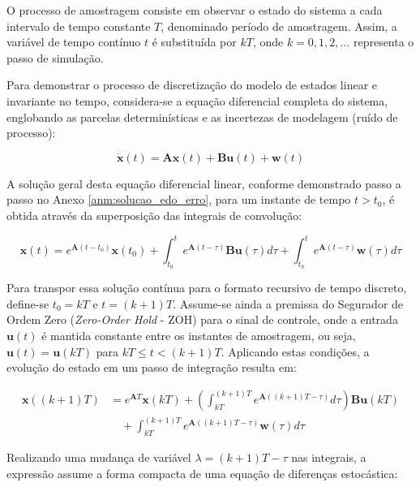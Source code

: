 \documentclass[a4paper,12pt]{article}
\begin{document}
O processo de amostragem consiste em observar o estado do sistema a cada intervalo de tempo constante $T$, denominado período de amostragem. Assim, a variável de tempo contínuo $t$ é substituída por $kT$, onde $k = 0, 1, 2, \dots$ representa o passo de simulação. 

Para demonstrar o processo de discretização do modelo de estados linear e invariante no tempo, considera-se a equação diferencial completa do sistema, englobando as parcelas determinísticas e as incertezas de modelagem (ruído de processo):

\begin{equation}
    \dot{\mathbf{x}}(t) = \mathbf{A}\mathbf{x}(t) + \mathbf{B}\mathbf{u}(t) + \mathbf{w}(t)
    \label{eq:dx_dt_completa}
\end{equation}

A solução geral desta equação diferencial linear, conforme demonstrado passo a passo no Anexo \ref{anm:solucao_edo_erro}, para um instante de tempo $t > t_0$, é obtida através da superposição das integrais de convolução:

\begin{equation}
    \mathbf{x}(t) = e^{\mathbf{A}(t-t_0)}\mathbf{x}(t_0) + \int_{t_0}^{t} e^{\mathbf{A}(t-\tau)} \mathbf{B}\mathbf{u}(\tau) d\tau + \int_{t_0}^{t} e^{\mathbf{A}(t-\tau)} \mathbf{w}(\tau) d\tau
\end{equation}

Para transpor essa solução contínua para o formato recursivo de tempo discreto, define-se $t_0 = kT$ e $t = (k+1)T$. Assume-se ainda a premissa do Segurador de Ordem Zero (\textit{Zero-Order Hold} - ZOH) para o sinal de controle, onde a entrada $\mathbf{u}(t)$ é mantida constante entre os instantes de amostragem, ou seja, $\mathbf{u}(t) = \mathbf{u}(kT)$ para $kT \le t < (k+1)T$. Aplicando estas condições, a evolução do estado em um passo de integração resulta em:

\begin{equation}
    \begin{split}
        \mathbf{x}((k+1)T) &= e^{\mathbf{A}T}\mathbf{x}(kT) + \left( \int_{kT}^{(k+1)T} e^{\mathbf{A}((k+1)T-\tau)} d\tau \right) \mathbf{B}\mathbf{u}(kT) \\
        &\quad + \int_{kT}^{(k+1)T} e^{\mathbf{A}((k+1)T-\tau)} \mathbf{w}(\tau) d\tau
    \end{split}
\end{equation}

Realizando uma mudança de variável $\lambda = (k+1)T - \tau$ nas integrais, a expressão assume a forma compacta de uma equação de diferenças estocástica:
\end{document}
